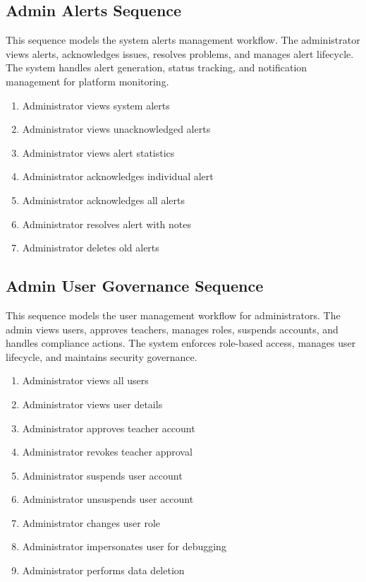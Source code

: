 
\subsection{Admin Alerts Sequence}
This sequence models the system alerts management workflow. The administrator
views alerts, acknowledges issues, resolves problems, and manages alert
lifecycle. The system handles alert generation, status tracking, and
notification management for platform monitoring.

\begin{enumerate}[topsep=0pt,itemsep=1pt,parsep=0pt,partopsep=0pt]
    \item Administrator views system alerts
    \item Administrator views unacknowledged alerts
    \item Administrator views alert statistics
    \item Administrator acknowledges individual alert
    \item Administrator acknowledges all alerts
    \item Administrator resolves alert with notes
    \item Administrator deletes old alerts
\end{enumerate}


\subsection{Admin User Governance Sequence}
This sequence models the user management workflow for administrators. The admin
views users, approves teachers, manages roles, suspends accounts, and handles
compliance actions. The system enforces role-based access, manages user
lifecycle, and maintains security governance.

\begin{enumerate}[topsep=0pt,itemsep=1pt,parsep=0pt,partopsep=0pt]
    \item Administrator views all users
    \item Administrator views user details
    \item Administrator approves teacher account
    \item Administrator revokes teacher approval
    \item Administrator suspends user account
    \item Administrator unsuspends user account
    \item Administrator changes user role
    \item Administrator impersonates user for debugging
    \item Administrator performs data deletion
\end{enumerate}

